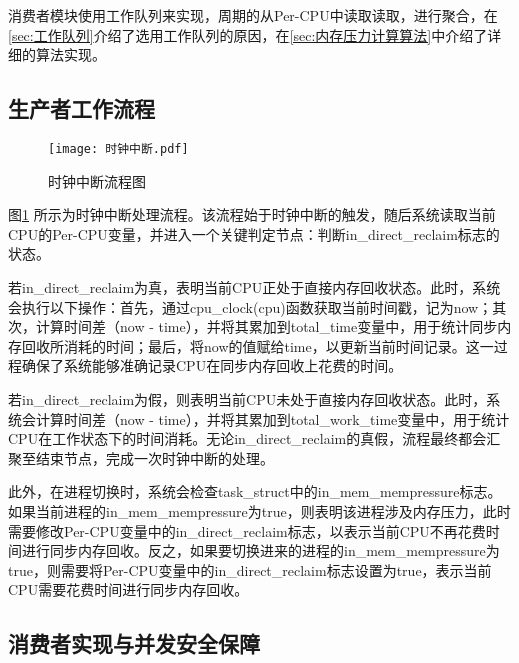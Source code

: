 消费者模块使用工作队列来实现，周期的从Per-CPU中读取读取，进行聚合，在\ref{sec:工作队列}介绍了选用工作队列的原因，在\ref{sec:内存压力计算算法}中介绍了详细的算法实现。


\subsection{生产者工作流程}

\begin{figure}[htbp]
    \centering
    \texttt{[image: 时钟中断.pdf]}
    \caption{时钟中断流程图}
    \label{fig:time-ticker}
\end{figure}
图\ref{fig:time-ticker} 所示为时钟中断处理流程。该流程始于时钟中断的触发，随后系统读取当前CPU的Per-CPU变量，并进入一个关键判定节点：判断in\_direct\_reclaim标志的状态。

若in\_direct\_reclaim为真，表明当前CPU正处于直接内存回收状态。此时，系统会执行以下操作：首先，通过cpu\_clock(cpu)函数获取当前时间戳，记为now；其次，计算时间差（now - time），并将其累加到total\_time变量中，用于统计同步内存回收所消耗的时间；最后，将now的值赋给time，以更新当前时间记录。这一过程确保了系统能够准确记录CPU在同步内存回收上花费的时间。

若in\_direct\_reclaim为假，则表明当前CPU未处于直接内存回收状态。此时，系统会计算时间差（now - time），并将其累加到total\_work\_time变量中，用于统计CPU在工作状态下的时间消耗。无论in\_direct\_reclaim的真假，流程最终都会汇聚至结束节点，完成一次时钟中断的处理。


此外，在进程切换时，系统会检查task\_struct中的in\_mem\_mempressure标志。如果当前进程的in\_mem\_mempressure为true，则表明该进程涉及内存压力，此时需要修改Per-CPU变量中的in\_direct\_reclaim标志，以表示当前CPU不再花费时间进行同步内存回收。反之，如果要切换进来的进程的in\_mem\_mempressure为true，则需要将Per-CPU变量中的in\_direct\_reclaim标志设置为true，表示当前CPU需要花费时间进行同步内存回收。

\subsection{消费者实现与并发安全保障}
\label{sec:consumer_implementation}


